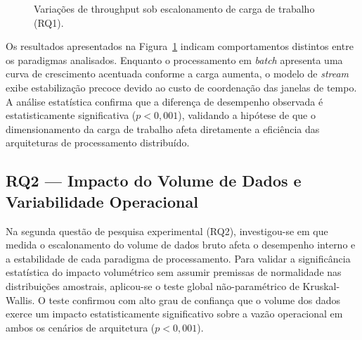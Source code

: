 \begin{figure}[htbp]
\centering
{}
\caption{Variações de throughput sob escalonamento de carga de trabalho (RQ1).}
\label{fig:rq1_dual_axis}
\end{figure}

Os resultados apresentados na Figura~\ref{fig:rq1_dual_axis} indicam comportamentos distintos entre os paradigmas analisados. Enquanto o processamento em \textit{batch} apresenta uma curva de crescimento acentuada conforme a carga aumenta, o modelo de \textit{stream} exibe estabilização precoce devido ao custo de coordenação das janelas de tempo. A análise estatística confirma que a diferença de desempenho observada é estatisticamente significativa ($p < 0{,}001$), validando a hipótese de que o dimensionamento da carga de trabalho afeta diretamente a eficiência das arquiteturas de processamento distribuído.


\subsection{RQ2 --- Impacto do Volume de Dados e Variabilidade Operacional}
Na segunda questão de pesquisa experimental (RQ2), investigou-se em que medida o escalonamento do volume de dados bruto afeta o desempenho interno e a estabilidade de cada paradigma de processamento. Para validar a significância estatística do impacto volumétrico sem assumir premissas de normalidade nas distribuições amostrais, aplicou-se o teste global não-paramétrico de Kruskal-Wallis. O teste confirmou com alto grau de confiança que o volume dos dados exerce um impacto estatisticamente significativo sobre a vazão operacional em ambos os cenários de arquitetura ($p < 0{,}001$).

